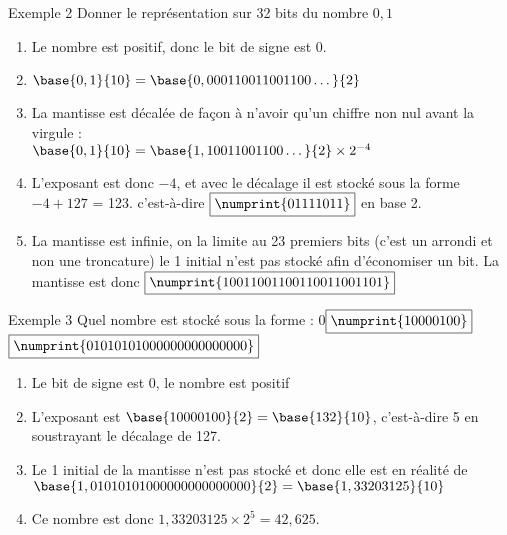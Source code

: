 \documentclass[10pt,french]{beamer}
\begin{document}
\begin{frame}{\Ctitle}{\stitle}
	\begin{exampleblock}{Exemple 2}
		Donner le représentation sur 32 bits du nombre $0,1$
		\begin{enumerate}
			\item<2-> Le nombre est positif, donc le bit de signe est \textcolor{BrickRed}{$\boxed{0}$}.
			\item<3-> $\base{0,1}{10} = \base{0,000110011001100\dots}{2}$
			\item<4-> La mantisse est décalée de façon à n'avoir qu'un chiffre non nul avant la virgule : \\
				$\base{0,1}{10} = \base{1,10011001100\dots}{2} \times 2^{-4}$
			\item<5-> L'exposant est donc $-4$, et avec le décalage il est stocké sous la forme $-4+127$ = 123. c'est-à-dire \textcolor{blue}{$\boxed{\numprint{01111011}}$} en base 2.
			\item<6-> La mantisse est infinie, on la limite au 23 premiers bits (c'est un arrondi et non une troncature) le 1 initial  n'est pas stocké afin d'économiser un bit. La mantisse est donc \textcolor{OliveGreen}{$\boxed{\numprint{10011001100110011001101}}$}
		\end{enumerate}
	\end{exampleblock}
\end{frame}

\begin{frame}{\Ctitle}{\stitle}
	\begin{exampleblock}{Exemple 3}
		Quel nombre est stocké sous la forme :
		\textcolor{BrickRed}{$\boxed{0}$}\textcolor{blue}{$\boxed{\numprint{10000100}}$}\textcolor{OliveGreen}{$\boxed{\numprint{01010101000000000000000}}$}
		\begin{enumerate}
			\item<1-> Le bit de signe est 0, le nombre est positif
			\item<2-> L'exposant est $\base{10000100}{2} = \base{132}{10}$, c'est-à-dire 5 en soustrayant le décalage de 127.
			\item<3-> Le 1 initial de la mantisse n'est pas stocké et donc elle est en réalité de $\base{1,01010101000000000000000}{2}=\base{1,33203125}{10}$
			\item<4-> Ce nombre est donc $1,33203125 \times 2^5 = 42,625$.
		\end{enumerate}
	\end{exampleblock}
\end{frame}
\end{document}
